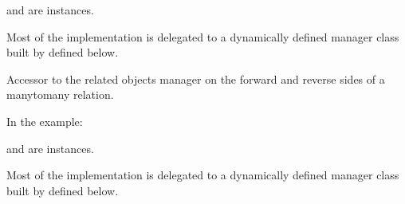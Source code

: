 \documentclass[letterpaper,10pt,english]{sphinxmanual}
\begin{document}
\begin{fulllineitems}
\begin{fulllineitems}
\sphinxAtStartPar
{} and  are 
instances.

\sphinxAtStartPar
Most of the implementation is delegated to a dynamically defined manager
class built by  defined below.

\end{fulllineitems}


\begin{fulllineitems}
\label{\detokenize{app:app.models.modele_io_mapping.resources}}
\pysigstartsignatures
{}
\pysigstopsignatures
\sphinxAtStartPar
Accessor to the related objects manager on the forward and reverse sides of
a many\sphinxhyphen{}to\sphinxhyphen{}many relation.

\sphinxAtStartPar
In the example:

\begin{sphinxVerbatim}[commandchars=\\\{\}]
 
       
\end{sphinxVerbatim}

\sphinxAtStartPar
{} and  are 
instances.

\sphinxAtStartPar
Most of the implementation is delegated to a dynamically defined manager
class built by  defined below.

\end{fulllineitems}


\end{fulllineitems}

\end{document}
